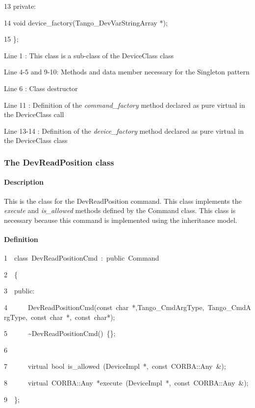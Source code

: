     13  private:

    14          void device\_factory(Tango\_DevVarStringArray {*});

    15  \};



Line 1 : This class is a sub-class of the DeviceClass class

Line 4-5 and 9-10: Methods and data member necessary for the Singleton
pattern

Line 6 : Class destructor

Line 11 : Definition of the \emph{command\_factory}
method declared as pure virtual in the DeviceClass call

Line 13-14 : Definition of the \emph{device\_factory}
method declared as pure virtual in the DeviceClass class


\subsubsection{The DevReadPosition class}


\paragraph{Description}

This is the class for the DevReadPosition command. This class implements
the \emph{execute} and \emph{is\_allowed}
methods defined by the Command class. This class is
necessary because this command is implemented using the inheritance
model.


\paragraph{Definition}


\begin{lyxcode}
1~~class~DevReadPositionCmd~:~public~Command

2~~\{

3~~public:

4~~~~~~DevReadPositionCmd(const~char~{*},Tango\_CmdArgType,~Tango\_CmdArgType,~const~char~{*},~const~char{*});

5~~~~~~\textasciitilde{}DevReadPositionCmd()~\{\};

6~~~~~~~~~~

7~~~~~~virtual~bool~is\_allowed~(DeviceImpl~{*},~const~CORBA::Any~\&);

8~~~~~~virtual~CORBA::Any~{*}execute~(DeviceImpl~{*},~const~CORBA::Any~\&);

9~~\};
\end{lyxcode}


